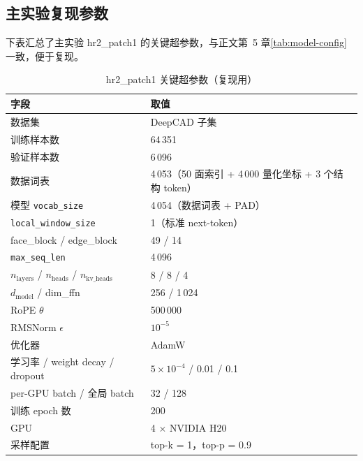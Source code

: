 \begin{thesisappendix}
\section{主实验复现参数}

下表汇总了主实验 hr2\_patch1 的关键超参数，与正文第~5 章\autoref{tab:model-config} 一致，便于复现。

\begin{table}[!h]
    \caption{hr2\_patch1 关键超参数（复现用）}
    \label{tab:repro-config}
    \small
    \begin{tabularx}{\textwidth}{p{4.1cm}L}
        \toprule
        字段 & 取值 \\
        \midrule
        数据集 & DeepCAD 子集 \\
        训练样本数 & 64\,351 \\
        验证样本数 & 6\,096 \\
        数据词表 & 4\,053（50 面索引 + 4\,000 量化坐标 + 3 个结构 token） \\
        模型 \texttt{vocab\_size} & 4\,054（数据词表 + PAD） \\
        \texttt{local\_window\_size} & 1（标准 next-token） \\
        face\_block / edge\_block & 49 / 14 \\
        \texttt{max\_seq\_len} & 4\,096 \\
         & 8 / 8 / 4 \\
        $d_{\text{model}}$ / dim\_ffn & 256 / 1\,024 \\
        RoPE $\theta$ & 500\,000 \\
        RMSNorm $\epsilon$ & $10^{-5}$ \\
        优化器 & AdamW \\
        学习率 / weight decay / dropout & $5 \times 10^{-4}$ / 0.01 / 0.1 \\
        per-GPU batch / 全局 batch & 32 / 128 \\
        训练 epoch 数 & 200 \\
        GPU & 4 $\times$ NVIDIA H20 \\
        采样配置 & top-k = 1，top-p = 0.9 \\
        \bottomrule
    \end{tabularx}
\end{table}

\end{thesisappendix}
